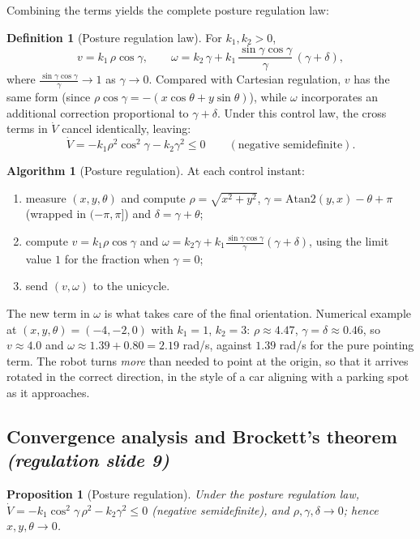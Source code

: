 \documentclass[11pt,a4paper]{article}
\theoremstyle{plain}
\newtheorem{proposition}[theorem]{Proposition}
\theoremstyle{definition}
\newtheorem{definition}[theorem]{Definition}
\newtheorem{algorithm}[theorem]{Algorithm}
\theoremstyle{remark}
\begin{document}
Combining the terms yields the complete posture regulation law:
\begin{definition}[Posture regulation law]
For $k_1,k_2>0$,
\[
v=k_1\,\rho\cos\gamma,\qquad
\omega=k_2\,\gamma+k_1\,\frac{\sin\gamma\cos\gamma}{\gamma}\,(\gamma+\delta),
\]
where $\frac{\sin\gamma\cos\gamma}{\gamma}\to1$ as $\gamma\to0$. Compared with Cartesian regulation, $v$ has the same form (since $\rho\cos\gamma = -(x\cos\theta+y\sin\theta)$), while $\omega$ incorporates an additional correction proportional to $\gamma+\delta$.
Under this control law, the cross terms in $\dot V$ cancel identically, leaving:
\[
\dot V = -k_1\rho^2\cos^2\gamma - k_2\gamma^2 \le 0\qquad (\text{negative semidefinite}).
\]
\end{definition}

\begin{algorithm}[Posture regulation]
At each control instant:
\begin{enumerate}[leftmargin=*,nosep]
\item measure $(x,y,\theta)$ and compute $\rho=\sqrt{x^2+y^2}$, $\gamma=\mathrm{Atan2}(y,x)-\theta+\pi$ (wrapped in $(-\pi,\pi]$) and $\delta=\gamma+\theta$;
\item compute $v=k_1\rho\cos\gamma$ and $\omega=k_2\gamma+k_1\frac{\sin\gamma\cos\gamma}{\gamma}(\gamma+\delta)$, using the limit value $1$ for the fraction when $\gamma=0$;
\item send $(v,\omega)$ to the unicycle.
\end{enumerate}
\end{algorithm}

\begin{intuition}
The new term in $\omega$ is what takes care of the final orientation. Numerical example at $(x,y,\theta)=(-4,-2,0)$ with $k_1=1$, $k_2=3$: $\rho\approx4.47$, $\gamma=\delta\approx0.46$, so $v\approx4.0$ and $\omega\approx1.39+0.80=2.19$ rad/s, against $1.39$ rad/s for the pure pointing term. The robot turns \emph{more} than needed to point at the origin, so that it arrives rotated in the correct direction, in the style of a car aligning with a parking spot as it approaches.
\end{intuition}

\subsection{Convergence analysis and Brockett's theorem \emph{(regulation slide 9)}}

\begin{proposition}[Posture regulation]\label{prop:post}
Under the posture regulation law, $\dot V=-k_1\cos^2\!\gamma\,\rho^2-k_2\gamma^2\le0$ (negative semidefinite), and $\rho,\gamma,\delta\to0$; hence $x,y,\theta\to0$.
\end{proposition}
\end{document}

